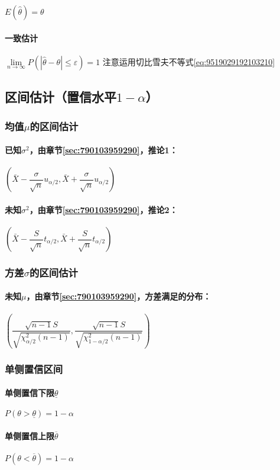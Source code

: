$E(\hat{\theta})=\theta$

\paragraph{一致估计}

$\lim\limits_{n\rightarrow \infty} P \left(\left| \hat{\theta} - \theta \right| \leq \varepsilon \right)= 1$\hspace{1cm} 注意运用切比雪夫不等式\ref{eq:9519029192103210}

\subsection{区间估计（置信水平$1-\alpha$）}

\subsubsection{均值$\mu$的区间估计}


\paragraph{已知$\sigma^2$，由章节\ref{sec:790103959290}，推论1：}

$\left( \bar{X} - \dfrac{\sigma}{\sqrt{n}} u_{\alpha/2}, \bar{X} + \dfrac{\sigma}{\sqrt{n}} u_{\alpha/2} \right)$

\paragraph{未知$\sigma^2$，由章节\ref{sec:790103959290}，推论2：}

$\left( \bar{X} - \dfrac{S}{\sqrt{n}} t_{\alpha/2}, \bar{X} + \dfrac{S}{\sqrt{n}} t_{\alpha/2} \right)$

\subsubsection{方差$\sigma$的区间估计}

\paragraph{未知$\mu$，由章节\ref{sec:790103959290}，方差满足的分布：}

$\left( \dfrac{\sqrt{n-1}S}{\sqrt{\chi^{2}_{\alpha/2} (n-1)}},\dfrac{\sqrt{n-1}S}{\sqrt{\chi^{2}_{1-\alpha/2} (n-1)}} \right)$

\subsubsection{单侧置信区间}

\paragraph{单侧置信下限$\underline{\theta}$}

$P(\theta > \underline{\theta}) = 1 - \alpha$

\paragraph{单侧置信上限$\overline{\theta}$}

$P(\theta < \overline{\theta}) = 1 - \alpha$
